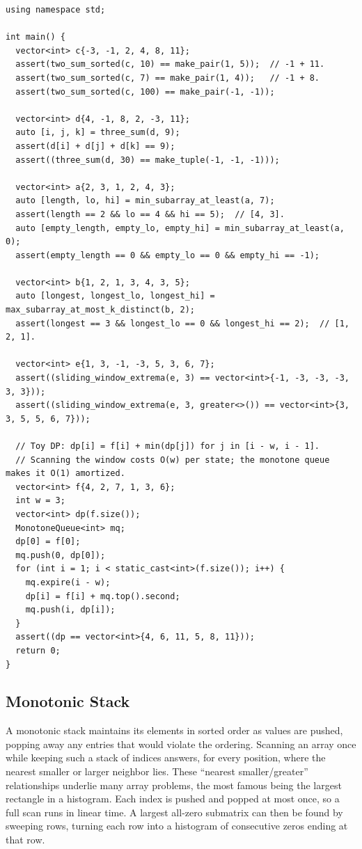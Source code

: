 \begin{lstlisting}[style=cpp]
using namespace std;

int main() {
  vector<int> c{-3, -1, 2, 4, 8, 11};
  assert(two_sum_sorted(c, 10) == make_pair(1, 5));  // -1 + 11.
  assert(two_sum_sorted(c, 7) == make_pair(1, 4));   // -1 + 8.
  assert(two_sum_sorted(c, 100) == make_pair(-1, -1));

  vector<int> d{4, -1, 8, 2, -3, 11};
  auto [i, j, k] = three_sum(d, 9);
  assert(d[i] + d[j] + d[k] == 9);
  assert((three_sum(d, 30) == make_tuple(-1, -1, -1)));

  vector<int> a{2, 3, 1, 2, 4, 3};
  auto [length, lo, hi] = min_subarray_at_least(a, 7);
  assert(length == 2 && lo == 4 && hi == 5);  // [4, 3].
  auto [empty_length, empty_lo, empty_hi] = min_subarray_at_least(a, 0);
  assert(empty_length == 0 && empty_lo == 0 && empty_hi == -1);

  vector<int> b{1, 2, 1, 3, 4, 3, 5};
  auto [longest, longest_lo, longest_hi] = max_subarray_at_most_k_distinct(b, 2);
  assert(longest == 3 && longest_lo == 0 && longest_hi == 2);  // [1, 2, 1].

  vector<int> e{1, 3, -1, -3, 5, 3, 6, 7};
  assert((sliding_window_extrema(e, 3) == vector<int>{-1, -3, -3, -3, 3, 3}));
  assert((sliding_window_extrema(e, 3, greater<>()) == vector<int>{3, 3, 5, 5, 6, 7}));

  // Toy DP: dp[i] = f[i] + min(dp[j]) for j in [i - w, i - 1].
  // Scanning the window costs O(w) per state; the monotone queue makes it O(1) amortized.
  vector<int> f{4, 2, 7, 1, 3, 6};
  int w = 3;
  vector<int> dp(f.size());
  MonotoneQueue<int> mq;
  dp[0] = f[0];
  mq.push(0, dp[0]);
  for (int i = 1; i < static_cast<int>(f.size()); i++) {
    mq.expire(i - w);
    dp[i] = f[i] + mq.top().second;
    mq.push(i, dp[i]);
  }
  assert((dp == vector<int>{4, 6, 11, 5, 8, 11}));
  return 0;
}
\end{lstlisting}
\subsection{Monotonic Stack}
\label{sec:1.2.4}
A monotonic stack maintains its elements in sorted order as values are pushed, popping away any entries that would violate the ordering. Scanning an array once while keeping such a stack of indices answers, for every position, where the nearest smaller or larger neighbor lies. These ``nearest smaller/greater'' relationships underlie many array problems, the most famous being the largest rectangle in a histogram. Each index is pushed and popped at most once, so a full scan runs in linear time. A largest all-zero submatrix can then be found by sweeping rows, turning each row into a histogram of consecutive zeros ending at that row.

